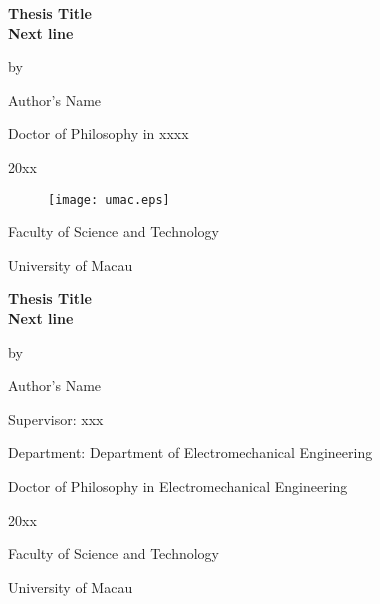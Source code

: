 \newpage
\thispagestyle{empty}

\hspace*{3cm}
\begin{center}
	{\bf {\Large Thesis Title  \\[1.5mm] Next line}

		\vfill
		by
		
		\vfill
		Author's Name
		
		\vfill
		\vfill
		\vfill
		
		Doctor of Philosophy in xxxx
		
		\vfill
		\vfill
		\vfill
		
		20xx
		
		\vfill
		
		\begin{figure}[tbh]
			\centerline{\texttt{[image: umac.eps]}}
		\end{figure}
		
		\begin{center}
			Faculty of Science and Technology
			
			University of Macau \end{center}
	}
	
	\vfill
	\vfill
	
\end{center}

\newpage\clearpage
\thispagestyle{empty} \hfill




\newpage\thispagestyle{empty}

\hspace*{3cm}
\begin{center}
	{\bf {\Large Thesis Title\\[1.5mm] Next line}

		\vfill
		
		by
		
		\vfill
		
		Author's Name
		
		\vfill
		
		Supervisor: xxx
		
		\vfill
		
		
		Department: Department of Electromechanical Engineering
		
		\vfill
		
		Doctor of Philosophy in Electromechanical Engineering
		
		\vfill
		
		20xx
		
		\vfill
		
		\begin{center}
			Faculty of Science and Technology
			
			University of Macau \end{center}
	}
	\vfill
	
\end{center}

